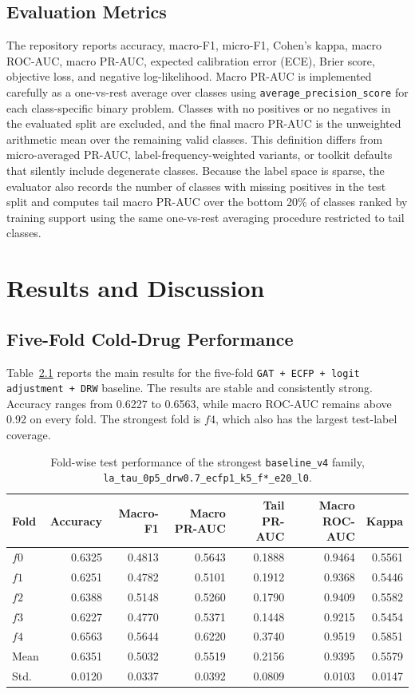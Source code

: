 \documentclass[12pt,a4paper]{report}
\begin{document}
\section{Evaluation Metrics}
The repository reports accuracy, macro-F1, micro-F1, Cohen's kappa, macro ROC-AUC, macro PR-AUC, expected calibration error (ECE), Brier score, objective loss, and negative log-likelihood. Macro PR-AUC is implemented carefully as a one-vs-rest average over classes using \texttt{average\_precision\_score} for each class-specific binary problem. Classes with no positives or no negatives in the evaluated split are excluded, and the final macro PR-AUC is the unweighted arithmetic mean over the remaining valid classes. This definition differs from micro-averaged PR-AUC, label-frequency-weighted variants, or toolkit defaults that silently include degenerate classes. Because the label space is sparse, the evaluator also records the number of classes with missing positives in the test split and computes tail macro PR-AUC over the bottom 20\% of classes ranked by training support using the same one-vs-rest averaging procedure restricted to tail classes.

\chapter{Results and Discussion}
\section{Five-Fold Cold-Drug Performance}
Table~\ref{tab:fold_results} reports the main results for the five-fold \texttt{GAT + ECFP + logit adjustment + DRW} baseline. The results are stable and consistently strong. Accuracy ranges from 0.6227 to 0.6563, while macro ROC-AUC remains above 0.92 on every fold. The strongest fold is \(f4\), which also has the largest test-label coverage.

\begin{table}[H]
\centering
\caption{Fold-wise test performance of the strongest \texttt{baseline\_v4} family, \texttt{la\_tau\_0p5\_drw0.7\_ecfp1\_k5\_f*\_e20\_l0}.}
\label{tab:fold_results}
\begin{tabular}{lrrrrrr}
\toprule
Fold & Accuracy & Macro-F1 & Macro PR-AUC & Tail PR-AUC & Macro ROC-AUC & Kappa \\
\midrule
\(f0\) & 0.6325 & 0.4813 & 0.5643 & 0.1888 & 0.9464 & 0.5561 \\
\(f1\) & 0.6251 & 0.4782 & 0.5101 & 0.1912 & 0.9368 & 0.5446 \\
\(f2\) & 0.6388 & 0.5148 & 0.5260 & 0.1790 & 0.9409 & 0.5582 \\
\(f3\) & 0.6227 & 0.4770 & 0.5371 & 0.1448 & 0.9215 & 0.5454 \\
\(f4\) & 0.6563 & 0.5644 & 0.6220 & 0.3740 & 0.9519 & 0.5851 \\
\midrule
Mean & 0.6351 & 0.5032 & 0.5519 & 0.2156 & 0.9395 & 0.5579 \\
Std. & 0.0120 & 0.0337 & 0.0392 & 0.0809 & 0.0103 & 0.0147 \\
\bottomrule
\end{tabular}
\end{table}
\end{document}
